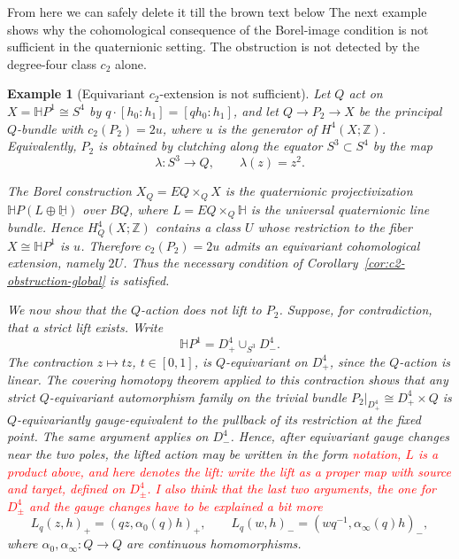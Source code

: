 \documentclass[11pt,a4paper]{article}
\numberwithin{equation}{section}
\newtheorem{example}[definition]{Example}
\theoremstyle{named}
\begin{document}
\iffalse

{\color{blue}From here we can safely delete it till the brown text below}
The next example shows why the cohomological consequence of the Borel-image condition is not sufficient in the quaternionic setting. The obstruction is not detected by the degree-four class \(c_2\) alone.

\begin{example}[Equivariant \(c_2\)-extension is not sufficient]
\label{ex:c2-not-sufficient}
Let \(Q\) act on \(X=\mathbb H P^1\cong S^4\) by \(q\cdot[h_0:h_1]=[qh_0:h_1]\), and let \(Q\longrightarrow P_2\longrightarrow X\) be the principal \(Q\)-bundle with \(c_2(P_2)=2u\), where \(u\) is the generator of \(H^4(X;\mathbb Z)\). Equivalently, \(P_2\) is obtained by clutching along the equator $S^3\subset S^4$ by the map
\[
\lambda:S^3\longrightarrow Q,
\qquad
\lambda(z)=z^2.
\]

The Borel construction \(X_Q=EQ\times_Q X\) is the quaternionic
projectivization \(\mathbb H P(L\oplus\underline{\mathbb H})\) over \(BQ\), where \(L=EQ\times_Q\mathbb H\) is the universal quaternionic line bundle. Hence \(H_Q^4(X;\mathbb Z)\) contains a class \(U\) whose restriction to the fiber \(X\cong\mathbb H P^1\) is \(u\). Therefore \(c_2(P_2)=2u\) admits an equivariant cohomological extension, namely \(2U\). Thus the necessary condition of Corollary~\ref{cor:c2-obstruction-global} is satisfied.

We now show that the \(Q\)-action does not lift to \(P_2\). Suppose, for
contradiction, that a strict lift exists. Write
\[
\mathbb H P^1=D^4_+\cup_{S^3}D^4_-.
\]
The contraction \(z\mapsto tz\), \(t\in[0,1]\), is \(Q\)-equivariant on
\(D^4_+\), since the \(Q\)-action is linear. The covering homotopy theorem applied to this contraction shows that any strict \(Q\)-equivariant automorphism family on the trivial bundle \(P_2|_{D^4_+}\cong D^4_+\times Q\) is \(Q\)-equivariantly gauge-equivalent to the pullback of its restriction at the fixed point. The same argument applies on \(D^4_-\). Hence, after equivariant gauge changes near the two poles, the lifted action may be written in the form \textcolor{red}{notation, $L$ is a product above, and here denotes the lift: write the lift as a proper map with source and target, defined on $D^4_\pm$. I also think that the last two arguments, the one for $D^4_\pm$ and the gauge changes have to be explained a bit more}
\[
L_q(z,h)_+=(qz,\alpha_0(q)h)_+,
\qquad
L_q(w,h)_-=(wq^{-1},\alpha_\infty(q)h)_-,
\]
where \(\alpha_0,\alpha_\infty:Q\longrightarrow Q\) are continuous
homomorphisms.


\end{example}
\end{document}
